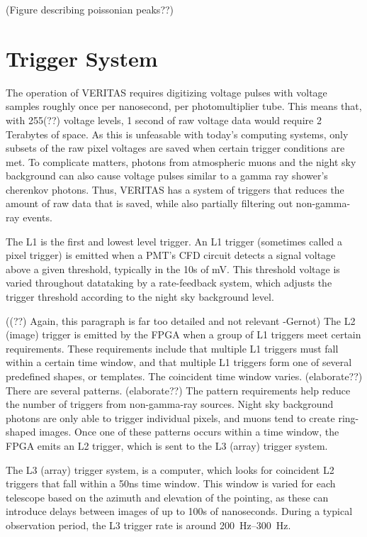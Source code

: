 {\color{red}(Figure describing poissonian peaks??)}



\section{Trigger System}\label{sec:trig}

The operation of VERITAS requires digitizing voltage pulses with voltage samples roughly once per nanosecond, per photomultiplier tube.
This means that, with 255{\color{red}(??)} voltage levels, 1 second of raw voltage data would require 2 Terabytes of space.
As this is unfeasable with today's computing systems, only subsets of the raw pixel voltages are saved when certain trigger conditions are met.
To complicate matters, photons from atmospheric muons and the night sky background can also cause voltage pulses similar to a gamma ray shower's cherenkov photons.
Thus, VERITAS has a system of triggers that reduces the amount of raw data that is saved, while also partially filtering out non-gamma-ray events.

The L1 is the first and lowest level trigger.
An L1 trigger (sometimes called a pixel trigger) is emitted when a PMT's CFD circuit detects a signal voltage above a given threshold, typically in the 10s of mV.
This threshold voltage is varied throughout datataking by a rate-feedback system, which adjusts the trigger threshold according to the night sky background level.

{\color{red}((??) Again, this paragraph is far too detailed and not relevant -Gernot)}
The L2 (image) trigger is emitted by the FPGA when a group of L1 triggers meet certain requirements.
These requirements include that multiple L1 triggers must fall within a certain time window, and that multiple L1 triggers form one of several predefined shapes, or templates.
The coincident time window varies. {\color{red}(elaborate??)}
There are several patterns. {\color{red}(elaborate??)}
The pattern requirements help reduce the number of triggers from non-gamma-ray sources.
Night sky background photons are only able to trigger individual pixels, and muons tend to create ring-shaped images.
Once one of these patterns occurs within a time window, the FPGA emits an L2 trigger, which is sent to the L3 (array) trigger system.

The L3 (array) trigger system, is a computer, which looks for coincident L2 triggers that fall within a \nicetilde50ns time window.
This window is varied for each telescope based on the azimuth and elevation of the pointing, as these can introduce delays between images of up to 100s of nanoseconds.
During a typical observation period, the L3 trigger rate is around \SIrange{200}{300}{Hz}.

